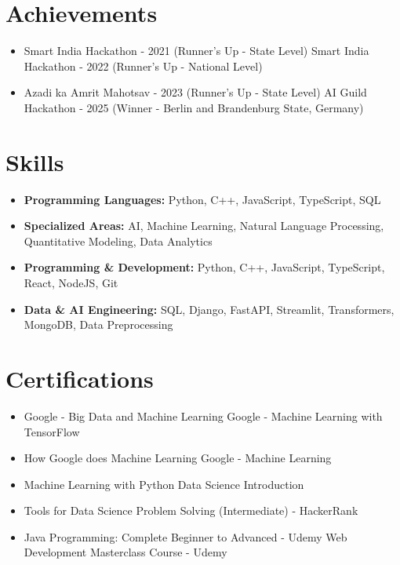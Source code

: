 \documentclass[a4paper,10pt]{article}
\begin{document}
\section*{Achievements}
\begin{itemize}
\item Smart India Hackathon - 2021 (Runner's Up - State Level) \hfill Smart India Hackathon - 2022 (Runner's Up - National Level)
\item Azadi ka Amrit Mahotsav - 2023 (Runner's Up - State Level) \hfill AI Guild Hackathon - 2025 (Winner - Berlin and Brandenburg State, Germany)
\end{itemize}

\section*{Skills}
\begin{itemize}
  \item \textbf{Programming Languages:} Python, C++, JavaScript, TypeScript, SQL
  \item \textbf{Specialized Areas:} AI, Machine Learning, Natural Language Processing, Quantitative Modeling, Data Analytics
  \item \textbf{Programming \& Development:} Python, C++, JavaScript, TypeScript, React, NodeJS, Git
  \item \textbf{Data \& AI Engineering:} SQL, Django, FastAPI, Streamlit, Transformers, MongoDB, Data Preprocessing
\end{itemize}

\section*{Certifications}
\begin{itemize}
\item Google - Big Data and Machine Learning \hfill Google - Machine Learning with TensorFlow
\item How Google does Machine Learning \hfill Google - Machine Learning
\item Machine Learning with Python \hfill Data Science Introduction
\item Tools for Data Science \hfill Problem Solving (Intermediate) - HackerRank
\item Java Programming: Complete Beginner to Advanced - Udemy \hfill Web Development Masterclass Course - Udemy
\end{itemize}
\end{document}
